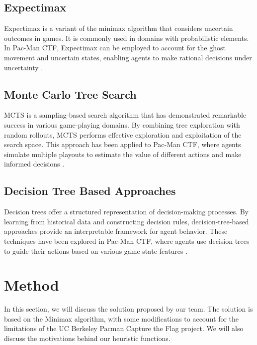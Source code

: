 \documentclass[a4paper,12pt]{article}
\begin{document}
\subsection{Expectimax}
\label{subsec:expectimax}
Expectimax is a variant of the minimax algorithm that considers uncertain outcomes in games. It is commonly used in domains with probabilistic elements. In Pac-Man CTF, Expectimax can be employed to account for the ghost movement and uncertain states, enabling agents to make rational decisions under uncertainty \cite{RIVEST198777}.


\subsection{Monte Carlo Tree Search}
\label{subsec:mcts}
MCTS is a sampling-based search algorithm that has demonstrated remarkable success in various game-playing domains. By combining tree exploration with random rollouts, MCTS performs effective exploration and exploitation of the search space. This approach has been applied to Pac-Man CTF, where agents simulate multiple playouts to estimate the value of different actions and make informed decisions \cite{GELLY20111856}.


\subsection{Decision Tree Based Approaches}
\label{subsec:decision_tree}
Decision trees offer a structured representation of decision-making processes. By learning from historical data and constructing decision rules, decision-tree-based approaches provide an interpretable framework for agent behavior. These techniques have been explored in Pac-Man CTF, where agents use decision trees to guide their actions based on various game state features \cite{Hastie2009}.


\section{Method}
\label{method}

In this section, we will discuss the solution proposed by our team. The solution is based on the Minimax algorithm, with some modifications to account for the limitations of the UC Berkeley Pacman Capture the Flag project. We will also discuss the motivations behind our heuristic functions.
\end{document}
